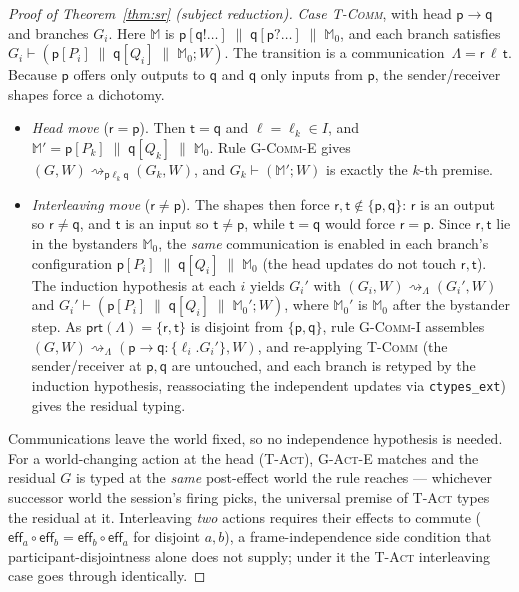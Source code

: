 \documentclass{article}
\theoremstyle{plain}
\theoremstyle{definition}
\newcommand{\reach}{\rightsquigarrow}
\newcommand{\id}[1]{\texttt{#1}}
\newcommand{\MM}{\mathbb{M}}
\newcommand{\ppar}{\;\|\;}
\newcommand{\prt}[1]{\mathsf{prt}(#1)}
\def \bgc {}
\def \egc {}
\begin{document}
\begin{proof}[Proof of Theorem~\ref{thm:sr} (subject reduction)]
\emph{Case \textsc{T-Comm}}, with head $\mathsf p{\to}\mathsf q$ and branches
$G_i$. Here $\MM$ is $\mathsf p[\mathsf q!\dots]\ppar\mathsf q[\mathsf
p?\dots]\ppar\MM_0$, and each branch satisfies $G_i\vdash(\mathsf p[P_i]\ppar
\mathsf q[Q_i]\ppar\MM_0;W)$. \bgc The transition is a communication\egc\
$\Lambda=\mathsf r\,\ell\,\mathsf t$. Because $\mathsf p$ offers only outputs to
$\mathsf q$ and $\mathsf q$ only inputs from $\mathsf p$, the sender/receiver
shapes force a dichotomy.
\begin{itemize}
\item \emph{Head move} ($\mathsf r=\mathsf p$). Then $\mathsf t=\mathsf q$ and
$\ell=\ell_k\in I$, and $\MM'=\mathsf p[P_k]\ppar\mathsf q[Q_k]\ppar\MM_0$. Rule
\textsc{G-Comm-E} gives $(G,W)\reach_{\mathsf p\ell_k\mathsf q}(G_k,W)$, and
$G_k\vdash(\MM';W)$ is exactly the $k$-th premise.
\item \emph{Interleaving move} ($\mathsf r\neq\mathsf p$). The shapes then force
$\mathsf r,\mathsf t\notin\{\mathsf p,\mathsf q\}$: $\mathsf r$ is an output so
$\mathsf r\neq\mathsf q$, and $\mathsf t$ is an input so $\mathsf t\neq\mathsf p$,
while $\mathsf t=\mathsf q$ would force $\mathsf r=\mathsf p$. Since $\mathsf
r,\mathsf t$ lie in the bystanders $\MM_0$, the \emph{same} communication is
enabled in each branch's configuration $\mathsf p[P_i]\ppar\mathsf
q[Q_i]\ppar\MM_0$ (the head updates do not touch $\mathsf r,\mathsf t$). The
induction hypothesis at each $i$ yields $G_i'$ with
$(G_i,W)\reach_\Lambda(G_i',W)$ and $G_i'\vdash(\mathsf p[P_i]\ppar\mathsf
q[Q_i]\ppar\MM_0';W)$, where $\MM_0'$ is $\MM_0$ after the bystander step. As
$\prt\Lambda=\{\mathsf r,\mathsf t\}$ is disjoint from $\{\mathsf
p,\mathsf q\}$, rule \textsc{G-Comm-I} assembles
$(G,W)\reach_\Lambda(\mathsf p{\to}\mathsf q{:}\{\ell_i.G_i'\},W)$, and
re-applying \textsc{T-Comm} (the sender/receiver at $\mathsf p,\mathsf q$ are
untouched, and each branch is retyped by the induction hypothesis, reassociating
the independent updates via \id{ctypes\_ext}) gives the residual typing.
\end{itemize}
Communications leave the world fixed, so no independence hypothesis is needed. For
a world-changing action at the head (\textsc{T-Act}), \textsc{G-Act-E} matches and
the residual $G$ is typed at the \emph{same} post-effect world the rule reaches
--- \bgc whichever successor world the session's firing picks, the universal
premise of \textsc{T-Act} types the residual at it\egc. Interleaving \emph{two} actions requires their effects to commute
($\mathsf{eff}_a\circ\mathsf{eff}_b=\mathsf{eff}_b\circ\mathsf{eff}_a$ for
disjoint $a,b$), a frame-independence side condition that participant-disjointness
alone does not supply; under it the \textsc{T-Act} interleaving case goes through
identically.
\end{proof}
\end{document}
